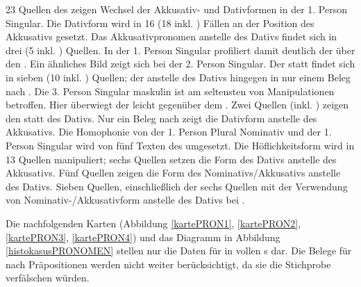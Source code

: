 

 
 
 
23 Quellen des  zeigen Wechsel der Akkusativ- und Dativformen in der 1. Person Singular. Die Dativform wird in 16 (18 inkl. \hai{{\PP}}) Fällen an der Position des Akkusativs gesetzt. Das Akkusativpronomen anstelle des Dativs findet sich in drei (5 inkl. \hai{{\PP}}) Quellen. In der 1. Person Singular profiliert damit deutlich der  über den . 
 Ein ähnliches Bild zeigt sich bei der 2. Person Singular. Der  statt  findet sich in sieben (10 inkl. \hai{{\PP}}) Quellen; der  anstelle des Dativs hingegen in nur einem Beleg nach .
 Die 3. Person Singular maskulin ist am seltensten von Manipulationen betroffen. Hier überwiegt der  leicht gegenüber dem . Zwei Quellen (inkl. \hai{{\PP}}) zeigen den  statt des Dativs. Nur ein Beleg nach  zeigt die Dativform anstelle des Akkusativs. 
 Die Homophonie von der 1. Person Plural Nominativ und der 1. Person Singular  wird von fünf Texten des  umgesetzt.
 Die Höflichkeitsform wird in 13 Quellen manipuliert; sechs Quellen setzen die Form des Dativs anstelle des Akkusativs. Fünf Quellen zeigen die Form des Nominativs/Akkusativs anstelle des Dativs. Sieben Quellen, einschließlich der sechs Quellen mit der Verwendung von Nominativ-/Akkusativform  anstelle des Dativs bei \hai{{\PP}}. 


 
 
 
 
 
 
 

 
Die nachfolgenden Karten (Abbildung \ref{kartePRON1}, \ref{kartePRON2}, \ref{kartePRON3}, \ref{kartePRON4}) und das Diagramm in Abbildung \ref{histokasusPRONOMEN} stellen nur die Daten für  in vollen \hai{{\NP}}s dar. Die Belege für  nach Präpositionen werden nicht weiter berücksichtigt, da sie die Stichprobe verfälschen würden.

